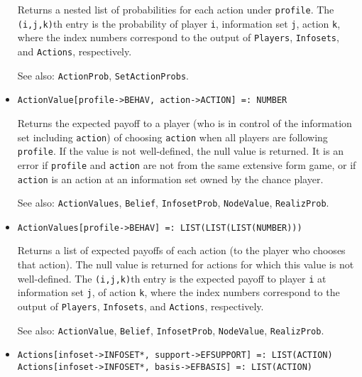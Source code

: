 \begin{itemize}
\bd 
Returns a nested list of probabilities for each action under
\verb+profile+.  The \verb+(i,j,k)+th entry is the probability of
player \verb+i+, information set \verb+j+, action \verb+k+, where the
index numbers correspond to the output of \verb+Players+, \verb+Infosets+,
and \verb+Actions+, respectively. 

\item [See also:] \verb+ActionProb+, \verb+SetActionProbs+.
\ed

\item{}
\protect \large \begin{verbatim}
ActionValue[profile->BEHAV, action->ACTION] =: NUMBER 
\end{verbatim}\normalsize

\bd 
Returns the expected payoff to a player (who is in control of the
information set including \verb+action+) of choosing \verb+action+ when
all players are following \verb+profile+.  If the value is not
well-defined, the null value is returned.  It is an error if
\verb+profile+ and \verb+action+ are not from the same extensive form
game, or if \verb+action+ is an action at an information set owned by
the chance player.

\item [See also:] \verb+ActionValues+, \verb+Belief+,
\verb+InfosetProb+, \verb+NodeValue+, \verb+RealizProb+.  
\ed

\item{}
\protect \large \begin{verbatim}
ActionValues[profile->BEHAV] =: LIST(LIST(LIST(NUMBER))) 
\end{verbatim}\normalsize

\bd
Returns a list of expected payoffs of each action (to the player
who chooses that action).  The null value is returned for actions for
which this value is not well-defined.  The \verb+(i,j,k)+th entry is
the expected payoff to player \verb+i+ at information set \verb+j+, of
action \verb+k+, where the index numbers correspond to the output of
\verb+Players+, \verb+Infosets+, and \verb+Actions+, respectively.

\item [See also:] \verb+ActionValue+, \verb+Belief+,
\verb+InfosetProb+, \verb+NodeValue+, \verb+RealizProb+.  
\ed

\item{}
\protect \large \begin{verbatim} 
Actions[infoset->INFOSET*, support->EFSUPPORT] =: LIST(ACTION) 
Actions[infoset->INFOSET*, basis->EFBASIS] =: LIST(ACTION) 
\end{verbatim}\normalsize


\end{itemize}
